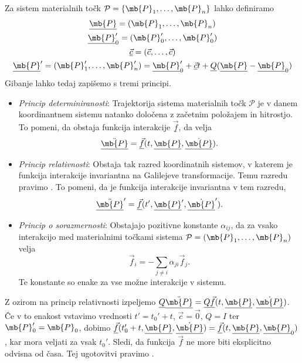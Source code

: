 \newcommand{\umb}[1]{\underline{\mb{#1}}}

Za sistem materialnih točk $\mathcal{P} = \{\mb{P}_1, \ldots, \mb{P}_n\}$ lahko
definiramo
\begin{gather*}
  \umb{P} = (\mb{P}_1, \ldots, \mb{P}_n) \\
  \umb{P}_0' = (\mb{P}_0', \ldots, \mb{P}_0') \\
  \underline{\vec{c}} = (\vec{c}, \ldots, \vec{c}) \\
  \umb{P}' = (\mb{P}_1', \ldots, \mb{P}_n') = \umb{P}_0' + \underline{\vec{c}} t
  + \underline{Q} (\umb{P} - \umb{P}_0)
\end{gather*}
Gibanje lahko tedaj zapišemo s tremi principi.
\begin{itemize}
\item \emph{Princip determiniranosti}: Trajektorija sistema materialnih točk
  $\mathcal{P}$ je v danem koordinantnem sistemu natanko določena z začetnim
  položajem in hitrostjo.
  To pomeni, da obstaja funkcija interakcije $\underline{\vec{f}}$, da velja
  \[
    \ddot{\umb{P}} = \underline{\vec{f}}(t, \umb{P}, \dot{\umb{P}}).
  \]
\item \emph{Princip relativnosti}: Obstaja tak razred koordinatnih sistemov, v
  katerem je funkcija interakcije invariantna na Galilejeve transformacije.
  Temu razredu pravimo .
  To pomeni, da je funkcija interakcije invariantna v tem razredu,
  \[
    \ddot{\umb{P}}' = \underline{\vec{f}}(t', \umb{P}', \dot{\umb{P}}').
  \]
\item \emph{Princip o sorazmernosti}: Obstajajo pozitivne konstante
  $\alpha_{ij}$, da za vsako interakcijo med materialnimi točkami sistema
  $\mathcal{P} = (\mb{P}_1, \ldots, \mb{P}_n)$ velja
  \[
    \vec{f}_i = - \sum_{j \ne i} \alpha_{ji} \vec{f}_{j}.
  \]
  Te konstante so enake za vse možne interakcije v sistemu.
\end{itemize}


Z ozirom na princip relativnosti izpeljemo $\underline{Q} \ddot{\umb{P}} =
\underline{Q} \underline{\vec{f}}(t, \umb{P}, \dot{\umb{P}})$.
Če v to enakost vstavimo vrednosti $t' = t_0' + t$, $\vec{c} = \vec{0}$, $Q = I$
ter $\mb{P}_0' = \mb{P}_0$, dobimo $\underline{\vec{f}}(t_0' + t, \umb{P},
\dot{\umb{P}}) = \underline{\vec{f}}(t, \umb{P}, \umb{P}_0)$, kar mora veljati
za vsak $t_0'$.
Sledi, da funkcija $\vec{f}$ ne more biti eksplicitno odvisna od časa.
Tej ugotovitvi pravimo .

